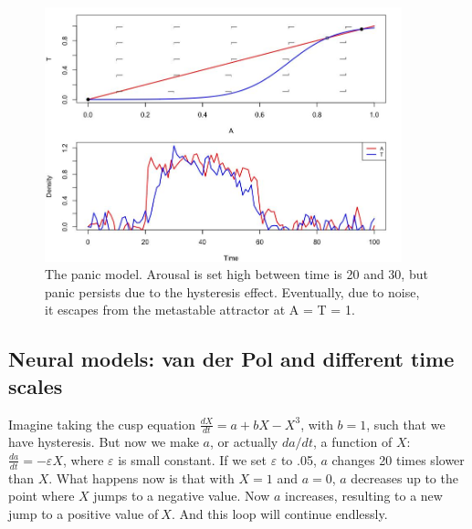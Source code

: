 \documentclass[
  letterpaper,
]{scrbook}
\begin{document}
\begin{figure}

{\centering \includegraphics[width=4.06906in,height=\textheight]{media/ch5/image13.jpg}

}

\caption{\label{fig-ch5-img13-old-61}The panic model. Arousal is set
high between time is 20 and 30, but panic persists due to the hysteresis
effect. Eventually, due to noise, it escapes from the metastable
attractor at A = T = 1.}

\end{figure}

\hypertarget{neural-models-van-der-pol-and-different-time-scales}{%
\subsection{Neural models: van der Pol and different time
scales}\label{neural-models-van-der-pol-and-different-time-scales}}

Imagine taking the cusp equation \(\frac{dX}{dt} = {a + bX - X}^{3}\),
with \(b=1\), such that we have hysteresis. But now we make \(a\), or
actually \(da/dt\), a function of \(X\):
\(\frac{da}{dt} = - \varepsilon X\), where \(\varepsilon\) is small
constant. If we set \(\varepsilon\) to .05, \(a\) changes 20 times
slower than \(X\). What happens now is that with \(X = 1\) and
\(a = 0\), \(a\) decreases up to the point where \(X\) jumps to a
negative value. Now \(a\) increases, resulting to a new jump to a
positive value of\(\ X\). And this loop will continue endlessly.
\end{document}
